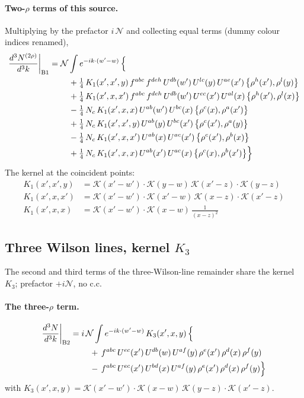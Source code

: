 \documentclass[10pt]{article}
\numberwithin{equation}{section}
\newcommand{\KK}{\mathcal K}
\newcommand{\NN}{\mathcal N}
\begin{document}
\paragraph{Two-$\rho$ terms of this source.} Multiplying by the prefactor $i\,\NN$ and collecting equal terms (dummy colour indices renamed),
\begin{align}
\frac{d^3N^{(2\rho)}}{d^3k}\bigg|_{\rm B1}={}&\NN\int e^{-ik\cdot(w'-w)}\,\Big\{\notag\\
&\quad +\tfrac14\,K_1(x',x',y)\,f^{abc}\,f^{deh}\,U^{db}(w')\,U^{lc}(y)\,U^{ae}(x')\,\big\{\rho^{h}(x'),\rho^{l}(y)\big\}\notag\\
&\quad +\tfrac14\,K_1(x',x,x')\,f^{abc}\,f^{deh}\,U^{db}(w')\,U^{ec}(x')\,U^{al}(x)\,\big\{\rho^{h}(x'),\rho^{l}(x)\big\}\notag\\
&\quad -\tfrac14\,N_{c}\,K_1(x',x,x)\,U^{ab}(w')\,U^{bc}(x)\,\big\{\rho^{c}(x),\rho^{a}(x')\big\}\notag\\
&\quad +\tfrac14\,N_{c}\,K_1(x',x',y)\,U^{ab}(y)\,U^{bc}(x')\,\big\{\rho^{c}(x'),\rho^{a}(y)\big\}\notag\\
&\quad -\tfrac14\,N_{c}\,K_1(x',x,x')\,U^{ab}(x)\,U^{ac}(x')\,\big\{\rho^{c}(x'),\rho^{b}(x)\big\}\notag\\
&\quad +\tfrac14\,N_{c}\,K_1(x',x,x)\,U^{ab}(x')\,U^{ac}(x)\,\big\{\rho^{c}(x),\rho^{b}(x')\big\}\Big\}\label{eq:res-B1}
\end{align}
The kernel at the coincident points:
\begin{align*}
K_1(x',x',y)&=\KK(x'-w')\cdot\KK(y-w)\,\KK(x'-z)\cdot\KK(y-z)\\K_1(x',x,x')&=\KK(x'-w')\cdot\KK(x'-w)\,\KK(x-z)\cdot\KK(x'-z)\\K_1(x',x,x)&=\KK(x'-w')\cdot\KK(x-w)\,\frac{1}{(x-z)^2}
\end{align*}
\subsection{Three Wilson lines, kernel $K_3$}\label{sec:B2}
The second and third terms of the three-Wilson-line remainder share the kernel $K_3$; prefactor $+i\NN$, no c.c.
\paragraph{The three-$\rho$ term.}
\begin{align}
\frac{d^3N}{d^3k}\bigg|_{\rm B2}={}&i\,\NN\int e^{-ik\cdot(w'-w)}\,K_3(x',x,y)\,\Big\{\notag\\
&\quad +\,f^{abc}\,U^{ec}(x')\,U^{db}(w)\,U^{af}(y)\,\rho^{e}(x')\,\rho^{d}(x)\,\rho^{f}(y)\notag\\
&\quad -\,f^{abc}\,U^{ec}(x')\,U^{bd}(x)\,U^{af}(y)\,\rho^{e}(x')\,\rho^{d}(x)\,\rho^{f}(y)\Big\}\label{eq:in-B2}
\end{align}
with $K_3(x',x,y)=\KK(x'-w')\cdot\KK(x-w)\,\KK(y-z)\cdot\KK(x'-z)$.
\end{document}
